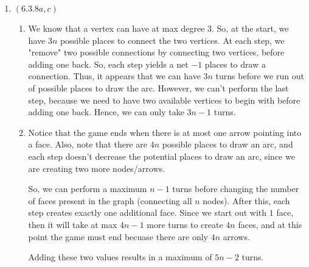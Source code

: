\documentclass[12pt]{article}
\begin{document}
\begin{enumerate}[start=1,label={\bfseries Problem \arabic*:},leftmargin=1in]
    \item $(6.3.8a, c)$ \begin{enumerate}
        \item We know that a vertex can have at max degree 3. So, at the start, we have $3n$ possible places to connect the two vertices. 
        At each step, we "remove" two possible connections by connecting two vertices, before adding one back. So, each step yields a net $-1$ places to 
        draw a connection. Thus, it appears that we can have $3n$ turns before we run out of possible places to draw the arc. However, we can't perform the last step, because 
        we need to have two available vertices to begin with before adding one back. Hence, we can only take $3n-1$ turns.
        
        \item Notice that the game ends when there is at most one arrow pointing into a face. 
        Also, note that there are $4n$ possible places to draw an arc, and each step doesn't decrease the potential places to draw an arc, since we are creating two more nodes/arrows. 

        So, we can perform a maximum $n-1$ turns before changing the number of faces present in the graph (connecting all $n$ nodes). 
        After this, each step creates exactly one additional face. Since we start out with $1$ face, then it will take at max $4n-1$ more turns to create $4n$ faces, and at this point 
        the game must end becuase there are only $4n$ arrows. 

        Adding these two values results in a maximum of $5n - 2$ turns. 
    \end{enumerate}
    
\end{enumerate}
\end{document}
